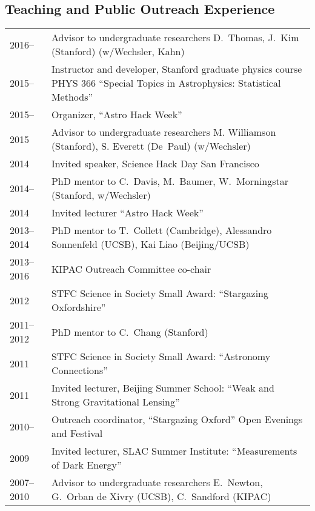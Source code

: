 \subsection*{Teaching and Public Outreach Experience}

\noindent
\begin{tabular}{@{}p{2.5cm}p{15.5cm}}
2016--        & Advisor to undergraduate researchers D.~Thomas, J.~Kim (Stanford)  (w/Wechsler, Kahn)\\
2015--      & Instructor and developer, Stanford graduate physics course PHYS 366 ``Special Topics in Astrophysics: Statistical Methods'' \\
2015--      & Organizer, ``Astro Hack Week'' \\
2015        & Advisor to undergraduate researchers M. Williamson (Stanford), S. Everett (De~Paul) (w/Wechsler)\\
2014        & Invited speaker, Science Hack Day San Francisco\\
2014--      & PhD mentor to C.~Davis, M.~Baumer, W.~Morningstar (Stanford, w/Wechsler)\\
2014        & Invited lecturer ``Astro Hack Week''\\
2013--2014  & PhD mentor to T.~Collett (Cambridge), Alessandro Sonnenfeld (UCSB), Kai Liao (Beijing/UCSB)\\
2013--2016  & KIPAC Outreach Committee co-chair \\
2012        & STFC Science in Society Small Award: ``Stargazing Oxfordshire''\\
2011--2012  & PhD mentor to C.~Chang (Stanford) \\
2011        & STFC Science in Society Small Award: ``Astronomy Connections''\\
2011        & Invited lecturer, Beijing Summer School: ``Weak and Strong Gravitational Lensing''\\
2010--      & Outreach coordinator, ``Stargazing Oxford'' Open Evenings and Festival\\
2009        & Invited lecturer, SLAC Summer Institute: ``Measurements of Dark Energy''\\
2007--2010  & Advisor to undergraduate researchers E.~Newton, G.~Orban de Xivry (UCSB), C.\ Sandford (KIPAC)\\

\end{tabular}
